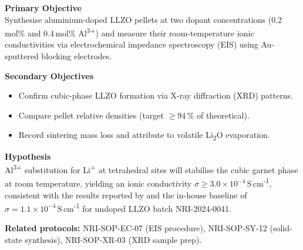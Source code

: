 
\begin{tcolorbox}[notebox, title={\faClipboardList\quad Objectives \& Hypothesis}]

  \textbf{Primary Objective}\\[3pt]
  Synthesise aluminium-doped LLZO pellets at two dopant concentrations
  (0.2\,mol\% and 0.4\,mol\% Al\textsuperscript{3+}) and measure their room-temperature
  ionic conductivities via electrochemical impedance spectroscopy (EIS) using
  Au-sputtered blocking electrodes.

  \vspace{6pt}
  \textbf{Secondary Objectives}
  \begin{itemize}[leftmargin=16pt, itemsep=2pt, topsep=2pt]
    \item Confirm cubic-phase LLZO formation via X-ray diffraction (XRD) patterns.
    \item Compare pellet relative densities (target $\geq 94\,\%$ of theoretical).
    \item Record sintering mass loss and attribute to volatile Li\textsubscript{2}O evaporation.
  \end{itemize}

  \vspace{8pt}
  \textbf{Hypothesis}\\[3pt]
  Al\textsuperscript{3+} substitution for Li\textsuperscript{+} at tetrahedral sites will
  stabilise the cubic garnet phase at room temperature, yielding an ionic conductivity
  $\sigma \geq 3.0 \times 10^{-4}$\,S\,cm\textsuperscript{-1}, consistent with
  the results reported by \cite{Geiger2011} and the in-house baseline of
  $\sigma = 1.1 \times 10^{-4}$\,S\,cm\textsuperscript{-1} for undoped LLZO
  batch NRI-2024-0041.

  \vspace{8pt}
  {\footnotesize\color{Graphite}
    \textbf{Related protocols:} NRI-SOP-EC-07 (EIS procedure),
    NRI-SOP-SY-12 (solid-state synthesis), NRI-SOP-XR-03 (XRD sample prep).
  }

\end{tcolorbox}
